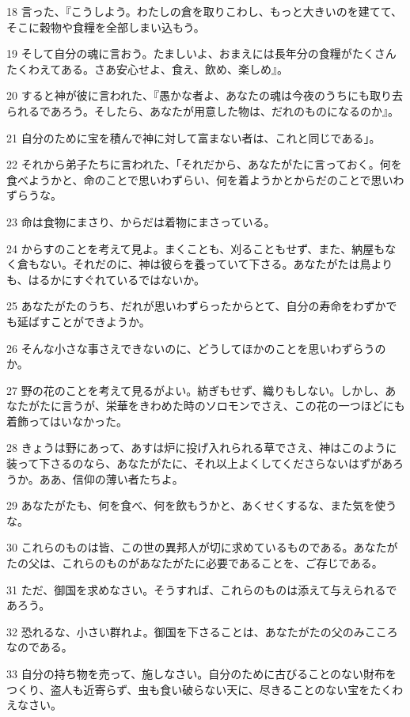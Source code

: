 \par 18 言った、『こうしよう。わたしの倉を取りこわし、もっと大きいのを建てて、そこに穀物や食糧を全部しまい込もう。
\par 19 そして自分の魂に言おう。たましいよ、おまえには長年分の食糧がたくさんたくわえてある。さあ安心せよ、食え、飲め、楽しめ』。
\par 20 すると神が彼に言われた、『愚かな者よ、あなたの魂は今夜のうちにも取り去られるであろう。そしたら、あなたが用意した物は、だれのものになるのか』。
\par 21 自分のために宝を積んで神に対して富まない者は、これと同じである」。
\par 22 それから弟子たちに言われた、「それだから、あなたがたに言っておく。何を食べようかと、命のことで思いわずらい、何を着ようかとからだのことで思いわずらうな。
\par 23 命は食物にまさり、からだは着物にまさっている。
\par 24 からすのことを考えて見よ。まくことも、刈ることもせず、また、納屋もなく倉もない。それだのに、神は彼らを養っていて下さる。あなたがたは鳥よりも、はるかにすぐれているではないか。
\par 25 あなたがたのうち、だれが思いわずらったからとて、自分の寿命をわずかでも延ばすことができようか。
\par 26 そんな小さな事さえできないのに、どうしてほかのことを思いわずらうのか。
\par 27 野の花のことを考えて見るがよい。紡ぎもせず、織りもしない。しかし、あなたがたに言うが、栄華をきわめた時のソロモンでさえ、この花の一つほどにも着飾ってはいなかった。
\par 28 きょうは野にあって、あすは炉に投げ入れられる草でさえ、神はこのように装って下さるのなら、あなたがたに、それ以上よくしてくださらないはずがあろうか。ああ、信仰の薄い者たちよ。
\par 29 あなたがたも、何を食べ、何を飲もうかと、あくせくするな、また気を使うな。
\par 30 これらのものは皆、この世の異邦人が切に求めているものである。あなたがたの父は、これらのものがあなたがたに必要であることを、ご存じである。
\par 31 ただ、御国を求めなさい。そうすれば、これらのものは添えて与えられるであろう。
\par 32 恐れるな、小さい群れよ。御国を下さることは、あなたがたの父のみこころなのである。
\par 33 自分の持ち物を売って、施しなさい。自分のために古びることのない財布をつくり、盗人も近寄らず、虫も食い破らない天に、尽きることのない宝をたくわえなさい。
